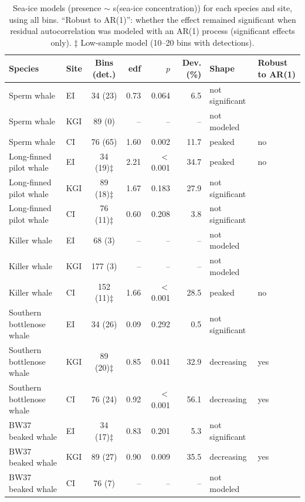 \documentclass[11pt]{article}
\begin{document}
\begin{table}[htbp]
\centering\footnotesize
\caption{Sea-ice models (presence $\sim$ s(sea-ice concentration)) for each species and site, using all bins. ``Robust to AR(1)'': whether the effect remained significant when residual autocorrelation was modeled with an AR(1) process (significant effects only). ‡ Low-sample model (10--20 bins with detections).}
\label{tab:seaice}
\begin{tabular}{llcrrrll}
\toprule
Species & Site & Bins (det.) & edf & $p$ & Dev. (\%) & Shape & Robust to AR(1) \\
\midrule
Sperm whale & EI & 34 (23) & 0.73 & 0.064 & 6.5 & not significant & \\
Sperm whale & KGI & 89 (0) & -- & -- & -- & not modeled & \\
Sperm whale & CI & 76 (65) & 1.60 & 0.002 & 11.7 & peaked & no \\
Long-finned pilot whale & EI & 34 (19)‡ & 2.21 & $<$0.001 & 34.7 & peaked & no \\
Long-finned pilot whale & KGI & 89 (18)‡ & 1.67 & 0.183 & 27.9 & not significant & \\
Long-finned pilot whale & CI & 76 (11)‡ & 0.60 & 0.208 & 3.8 & not significant & \\
Killer whale & EI & 68 (3) & -- & -- & -- & not modeled & \\
Killer whale & KGI & 177 (3) & -- & -- & -- & not modeled & \\
Killer whale & CI & 152 (11)‡ & 1.66 & $<$0.001 & 28.5 & peaked & no \\
Southern bottlenose whale & EI & 34 (26) & 0.09 & 0.292 & 0.5 & not significant & \\
Southern bottlenose whale & KGI & 89 (20)‡ & 0.85 & 0.041 & 32.9 & decreasing & yes \\
Southern bottlenose whale & CI & 76 (24) & 0.92 & $<$0.001 & 56.1 & decreasing & yes \\
BW37 beaked whale & EI & 34 (17)‡ & 0.83 & 0.201 & 5.3 & not significant & \\
BW37 beaked whale & KGI & 89 (27) & 0.90 & 0.009 & 35.5 & decreasing & yes \\
BW37 beaked whale & CI & 76 (7) & -- & -- & -- & not modeled & \\
\bottomrule
\end{tabular}
\end{table}
\end{document}
